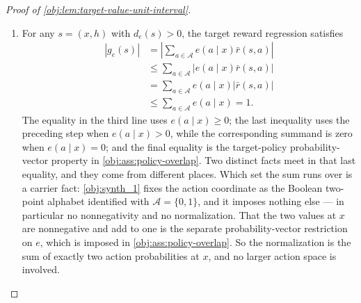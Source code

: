 \documentclass[11pt]{article}
\begin{document}
\begin{proof}[Proof of \cref{obj:lem:target-value-unit-interval}]
\begin{enumerate}
The action-coordinate argument uses the local hypothesis \(e(a\mid x)>0\), the nonnegativity of the behavior carrier, and the policy-overlap inequality. The inequality comes from \cref{obj:ass:policy-overlap}, which for the policy-overlap constant \(L\) gives
\[
e(a\mid x)\le L\,b(a\mid x);
\]
the nonnegativity \(b(a\mid x)\ge0\) comes from \cref{obj:ass:sequential-ignorability}, which is where \(b\) is declared a probability vector. If \(b(a\mid x)\) were not positive, that nonnegativity would force \(b(a\mid x)=0\), whence \(0<e(a\mid x)\le L\cdot0=0\), a contradiction. Thus \(b(a\mid x)>0\). The row bound from the previous step applies, and hence
\[
|\bar r(s,a)|\le1
\qquad
\text{whenever } d_e(s)>0 \text{ and } e(a\mid x)>0.
\]

\item For any \(s=(x,h)\) with \(d_e(s)>0\), the target reward regression satisfies
\[
\begin{aligned}
|g_e(s)|
&=
\left|\sum_{a\in\mathcal A} e(a\mid x)\bar r(s,a)\right|  \\
&\le
\sum_{a\in\mathcal A} \left|e(a\mid x)\bar r(s,a)\right| \\
&=
\sum_{a\in\mathcal A} e(a\mid x)|\bar r(s,a)| \\
&\le
\sum_{a\in\mathcal A} e(a\mid x)
=1.
\end{aligned}
\]
The equality in the third line uses \(e(a\mid x)\ge0\); the last inequality uses the preceding step when \(e(a\mid x)>0\), while the corresponding summand is zero when \(e(a\mid x)=0\); and the final equality is the target-policy probability-vector property in \cref{obj:ass:policy-overlap}. Two distinct facts meet in that last equality, and they come from different places. Which set the sum runs over is a carrier fact: \cref{obj:synth_1} fixes the action coordinate as the Boolean two-point alphabet identified with \(\mathcal A=\{0,1\}\), and it imposes nothing else --- in particular no nonnegativity and no normalization. That the two values at \(x\) are nonnegative and add to one is the separate probability-vector restriction on \(e\), which is imposed in \cref{obj:ass:policy-overlap}. So the normalization is the sum of exactly two action probabilities at \(x\), and no larger action space is involved.


\end{enumerate}
\end{proof}
\end{document}
